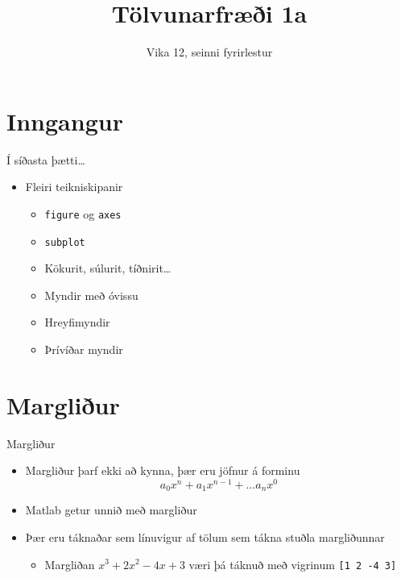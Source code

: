 \documentclass[handout]{beamer}
\title{Tölvunarfræði 1a}
\subtitle{Vika 12, seinni fyrirlestur}
\begin{document}
\begin{frame}
\titlepage
\end{frame}

\section{Inngangur}

\begin{frame}{Í síðasta þætti\ldots}
    \begin{itemize}
        \item Fleiri teikniskipanir
        \begin{itemize}
            \item \texttt{figure} og \texttt{axes}
            \item \texttt{subplot}
            \item Kökurit, súlurit, tíðnirit\ldots
            \item Myndir með óvissu
            \item Hreyfimyndir
            \item Þrívíðar myndir
        \end{itemize}
    \end{itemize}
\end{frame}

\section{Margliður}

\begin{frame}[fragile]{Margliður}
\begin{itemize}
 \item Margliður þarf ekki að kynna, þær eru jöfnur á forminu
\[
 a_0x^n + a_1x^{n-1} + \ldots a_nx^0
\]
 \item Matlab getur unnið með margliður
 \item Þær eru táknaðar sem línuvigur af tölum sem tákna stuðla margliðunnar
 \begin{itemize}
  \item Margliðan $x^3 + 2x^2 -4x +3$ væri þá táknuð með vigrinum \verb|[1 2 -4 3]|
 \end{itemize} 
\end{itemize}
\end{frame}
\end{document}
